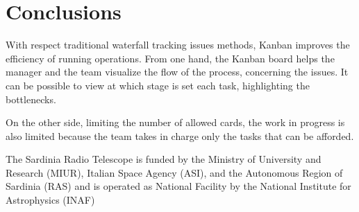 \documentclass[a4paper]{spie}  %
\begin{document}
\section{Conclusions}
With respect traditional waterfall tracking issues methods, Kanban improves the efficiency of running operations.
From one hand, the Kanban board helps the manager and the team  visualize the flow of the process, concerning the issues. It can be possible to view at which stage is set each task, highlighting the bottlenecks.

On the other side, limiting the number of allowed cards, the work in progress is also limited because the team takes in charge only the tasks that  can be afforded.
 
\acknowledgments %


 
The Sardinia Radio Telescope is funded by the Ministry of University and Research (MIUR), Italian Space Agency (ASI), and the Autonomous Region of Sardinia (RAS) and is operated as National Facility by the National Institute for Astrophysics (INAF)

\end{document}

